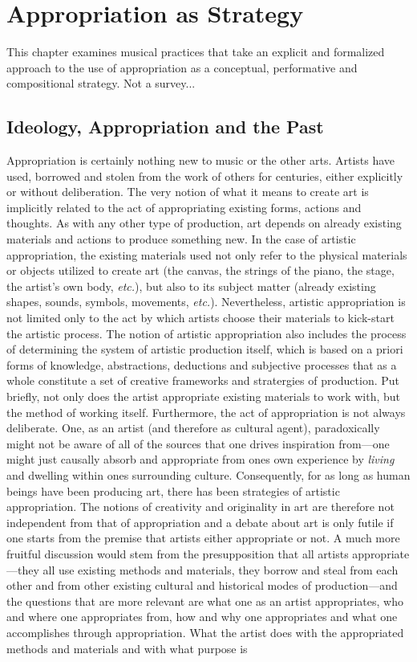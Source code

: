 \hypertarget{chapter5}{}
\chapter{Appropriation as Strategy}

This chapter examines musical practices that take an explicit and formalized approach to the use of appropriation as a conceptual, performative and compositional strategy.
Not a survey...

\section{Ideology, Appropriation and the Past}

Appropriation is certainly nothing new to music or the other arts. Artists have used, borrowed and stolen from the work of others for centuries, either explicitly or without deliberation. The very notion of what it means to create art is implicitly related to the act of appropriating existing forms, actions and thoughts. As with any other type of production, art depends on already existing materials and actions to produce something new. In the case of artistic appropriation, the existing materials used not only refer to the physical materials or objects utilized to create art (the canvas, the strings of the piano, the stage, the artist's own body, \emph{etc.}), but also to its subject matter (already existing shapes, sounds, symbols, movements, \emph{etc.}). Nevertheless, artistic appropriation is not limited only to the act by which artists choose their materials to kick-start the artistic process. The notion of artistic appropriation also includes the process of determining the system of artistic production itself, which is based on a priori forms of knowledge, abstractions, deductions and subjective processes that as a whole constitute a set of creative frameworks and stratergies of production. Put briefly, not only does the artist appropriate existing materials to work with, but the method of working itself. Furthermore, the act of appropriation is not always deliberate. One, as an artist (and therefore as cultural agent), paradoxically might not be aware of all of the sources that one drives inspiration from---one might just causally absorb and appropriate from ones own experience by \emph{living} and dwelling within ones surrounding culture. Consequently, for as long as human beings have been producing art, there has been strategies of artistic appropriation. The notions of creativity and originality in art are therefore not independent from that of appropriation and a debate about art is only futile if one starts from the premise that artists either appropriate or not. A much more fruitful discussion would stem from the presupposition that all artists appropriate---they all use existing methods and materials, they borrow and steal from each other and from other existing cultural and historical modes of production---and the questions that are more relevant are what one as an artist appropriates, who and where one appropriates from, how and why one appropriates and what one accomplishes through appropriation. What the artist does with the appropriated methods and materials and with what purpose is 